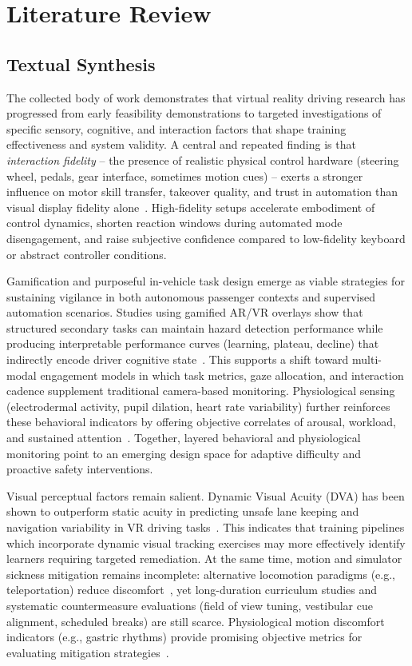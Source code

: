 \chapter{Literature Review}{\label{ch:lit_review}}

\section*{Textual Synthesis}
\noindent The collected body of work demonstrates that virtual reality driving research has progressed from early feasibility demonstrations to targeted investigations of specific sensory, cognitive, and interaction factors that shape training effectiveness and system validity. A central and repeated finding is that \emph{interaction fidelity} -- the presence of realistic physical control hardware (steering wheel, pedals, gear interface, sometimes motion cues) -- exerts a stronger influence on motor skill transfer, takeover quality, and trust in automation than visual display fidelity alone~\cite{Harari2021,He2022}. High-fidelity setups accelerate embodiment of control dynamics, shorten reaction windows during automated mode disengagement, and raise subjective confidence compared to low-fidelity keyboard or abstract controller conditions.

Gamification and purposeful in-vehicle task design emerge as viable strategies for sustaining vigilance in both autonomous passenger contexts and supervised automation scenarios. Studies using gamified AR/VR overlays show that structured secondary tasks can maintain hazard detection performance while producing interpretable performance curves (learning, plateau, decline) that indirectly encode driver cognitive state~\cite{Muguro2021,Muguro2023}. This supports a shift toward multi-modal engagement models in which task metrics, gaze allocation, and interaction cadence supplement traditional camera-based monitoring. Physiological sensing (electrodermal activity, pupil dilation, heart rate variability) further reinforces these behavioral indicators by offering objective correlates of arousal, workload, and sustained attention~\cite{Qadir2019,Muguro2023,Abdurrahman2021}. Together, layered behavioral and physiological monitoring point to an emerging design space for adaptive difficulty and proactive safety interventions.

Visual perceptual factors remain salient. Dynamic Visual Acuity (DVA) has been shown to outperform static acuity in predicting unsafe lane keeping and navigation variability in VR driving tasks~\cite{Hwang2020}. This indicates that training pipelines which incorporate dynamic visual tracking exercises may more effectively identify learners requiring targeted remediation. At the same time, motion and simulator sickness mitigation remains incomplete: alternative locomotion paradigms (e.g., teleportation) reduce discomfort~\cite{Lindal2019}, yet long-duration curriculum studies and systematic countermeasure evaluations (field of view tuning, vestibular cue alignment, scheduled breaks) are still scarce. Physiological motion discomfort indicators (e.g., gastric rhythms) provide promising objective metrics for evaluating mitigation strategies~\cite{Trofimova2021}.

